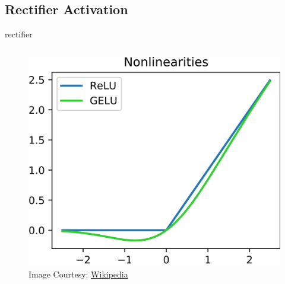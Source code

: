 \documentclass[aspectratio=169,xcolor={dvipsnames,svgnames}]{beamer}
\begin{document}
\subsection{Rectifier Activation}
\label{sec:org271b691}
\begin{frame}[label={sec:rectifier-activation}]{rectifier}
\begin{columns}
\begin{column}{0.45\columnwidth}
\begin{figure}[htbp]
\centering
\includegraphics[width=.9\linewidth]{org-download-images/details/2024-09-16_22-52-05_screenshot.png}
\caption{Image Courtesy: \href{https://commons.wikimedia.org/wiki/File:ReLU\_and\_GELU.svg}{Wikipedia}}
\end{figure}
\end{column}


\end{columns}
\end{frame}
\end{document}
